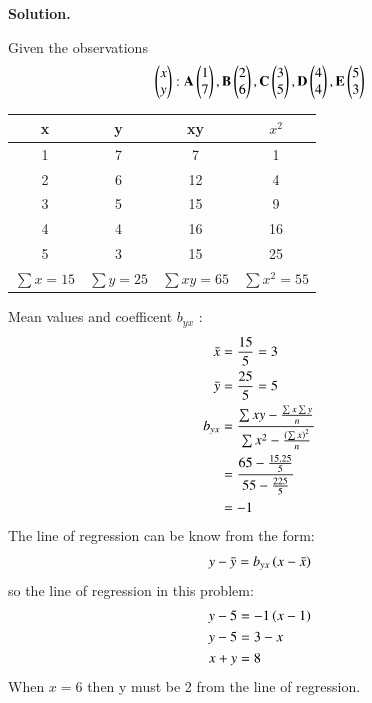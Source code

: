 \documentclass[journal,12pt,twocolumn]{IEEEtran}
\begin{document}
\textbf{Solution.}

Given the observations \\
\begin{align}
\begin{pmatrix}x \\y \end{pmatrix}:
\mathbf{A}\begin{pmatrix}1 \\7 \end{pmatrix},
\mathbf {B}\begin{pmatrix}2 \\6 \end{pmatrix},
\mathbf {C}\begin{pmatrix}3 \\5 \end{pmatrix},
 \mathbf {D}\begin{pmatrix}4 \\4 \end{pmatrix},
\mathbf {E}\begin{pmatrix}5 \\3 \end{pmatrix}
\end{align}
\begin{table}[H]
	\resizebox{\columnwidth}{!} {
		\begin{tabular}{|c|c|c|c|}
			\hline
			x & y & xy & $x^{2}$ \\
			\hline
			1 &  7 & 7  &1 \\
		
				2 &  6 & 12   &4 \\
			
				3 &  5 & 15  &9 \\
			
				4 &  4 & 16  &16 \\
			
				5 &  3 & 15  &25 \\
			\hline
			$\sum x=15$ &$\sum  y=25$ &$\sum xy=65$  &$\sum x^2=55$  \\
			\hline
		\end{tabular}
	}
\end{table}
Mean values and coefficent $b_{yx}$ :
\begin{align}
	\bar{x}&=\frac{15}{5}=3\\
	\bar{y}&=\frac{25}{5}=5\\
	b_{yx} &=\frac{\sum xy - \frac{\sum x \sum y}{n}}{\sum x^{2}- \frac {\left(\sum x\right)^{2}}{n} }\\
	&=\frac{65 -\frac{15.25}{5}}{55-\frac{225}{5}}\\
	&= -1 
\end{align}
The line of regression can be know from the form:
\begin{align}
	y-\bar{y}=b_{yx}\left(x-\bar{x}\right)
\end{align}
so the line of regression in this problem:
\begin{align}
	y-5&=-1\left(x-1\right) \\
	y-5&=3-x\\
	x+y&=8
\end{align}
When $x=6$ then y must be 2 from the line of regression.
\end{document}
